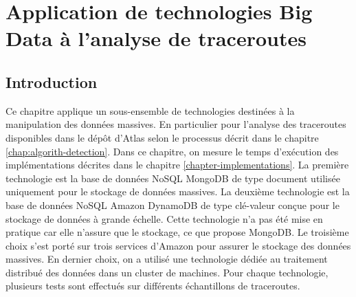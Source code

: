 \chapter{Application de  technologies Big Data à l'analyse de  traceroutes} \label{chap:application-on-traceroutes}


\section{Introduction}

Ce chapitre applique un sous-ensemble de  technologies destinées  à la manipulation des données massives. En particulier  pour l'analyse des traceroutes disponibles dans le dépôt d'Atlas selon le processus décrit dans le chapitre \ref{chap:algorith-detection}. Dans ce chapitre, on mesure le temps d'exécution  des  implémentations  décrites dans le chapitre \ref{chapter-implementations}.  
 La première technologie est la base de données NoSQL MongoDB de type document  utilisée uniquement pour le stockage de données massives. La deuxième technologie est la base de données NoSQL  Amazon DynamoDB de type clé-valeur conçue pour le stockage de données à grande échelle. Cette technologie n'a pas été  mise en pratique car elle n'assure que le stockage, ce que propose MongoDB.
 Le troisième choix s'est porté sur trois services d'Amazon pour assurer le stockage des données massives. En dernier choix, on a  utilisé une technologie dédiée  au traitement distribué des données dans un cluster de machines. Pour chaque technologie, plusieurs tests sont effectués sur différents échantillons de traceroutes.


 

